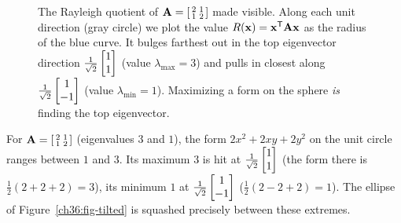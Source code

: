 \begin{figure}[H]
\centering
{}
\caption{The Rayleigh quotient of $\mathbf{A}=\left[\begin{smallmatrix}2&1\\1&2\end{smallmatrix}\right]$
made visible. Along each unit direction (gray circle) we plot the value
$R(\mathbf{x})=\mathbf{x}^{\mathsf{T}}\mathbf{A}\mathbf{x}$ as the radius of the blue curve. It bulges
farthest out in the top eigenvector direction $\tfrac{1}{\sqrt2}\begin{bmatrix}1\\1\end{bmatrix}$
(value $\lambda_{\max}=3$) and pulls in closest along $\tfrac{1}{\sqrt2}\begin{bmatrix}1\\-1\end{bmatrix}$
(value $\lambda_{\min}=1$). Maximizing a form on the sphere \emph{is} finding the top
eigenvector.}
\label{ch36:fig-rayleigh}
\end{figure}

\begin{example}
\label{ch36:ex-rayleigh}
For $\mathbf{A}=\left[\begin{smallmatrix}2&1\\1&2\end{smallmatrix}\right]$ (eigenvalues $3$ and $1$), the form
$2x^2+2xy+2y^2$ on the unit circle ranges between $1$ and $3$. Its maximum $3$ is hit
at $\tfrac{1}{\sqrt2}\begin{bmatrix}1\\1\end{bmatrix}$ (the form there is $\tfrac12(2+2+2)=3$), its
minimum $1$ at $\tfrac{1}{\sqrt2}\begin{bmatrix}1\\-1\end{bmatrix}$ ($\tfrac12(2-2+2)=1$). The ellipse of
Figure~\ref{ch36:fig-tilted} is squashed precisely between these extremes.
\end{example}

